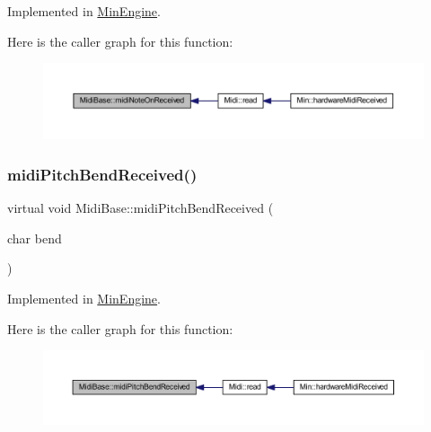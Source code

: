 Implemented in \hyperlink{class_min_engine_a108d70cfac8c363fbf6445f679dcf4d5}{Min\+Engine}.

Here is the caller graph for this function\+:
\nopagebreak
\begin{figure}[H]
\begin{center}
\leavevmode
\includegraphics[width=350pt]{de/def/class_midi_base_aa977f9f3db59b0a8b892ee28bcf93695_icgraph}
\end{center}
\end{figure}
\mbox{\label{class_midi_base_acfb1d2aef9901779bb53e0847121c13d}} 
\subsubsection{\texorpdfstring{midi\+Pitch\+Bend\+Received()}{midiPitchBendReceived()}}
{\footnotesize\ttfamily virtual void Midi\+Base\+::midi\+Pitch\+Bend\+Received (\begin{DoxyParamCaption}\item[{char}]{bend }\end{DoxyParamCaption})\hspace{0.3cm}{\ttfamily [pure virtual]}}



Implemented in \hyperlink{class_min_engine_a5b0f6a252cc4958e81d8989872105544}{Min\+Engine}.

Here is the caller graph for this function\+:
\nopagebreak
\begin{figure}[H]
\begin{center}
\leavevmode
\includegraphics[width=350pt]{de/def/class_midi_base_acfb1d2aef9901779bb53e0847121c13d_icgraph}
\end{center}
\end{figure}
\mbox{\label{class_midi_base_a968da0cf67e9a84757cbc2dbce90bc39}} 
